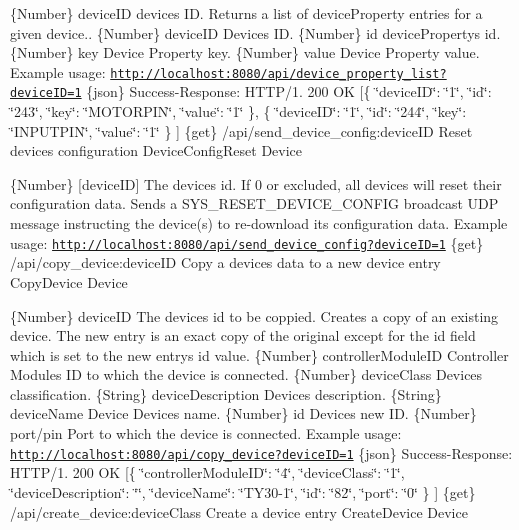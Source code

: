 \{Number\} device\+ID device\textquotesingle{}s ID.  Returns a list of device\+Property entries for a given device..  \{Number\} device\+ID Device\textquotesingle{}s ID.  \{Number\} id device\+Property\textquotesingle{}s id.  \{Number\} key Device Property key.  \{Number\} value Device Property value.  Example usage\+: \href{http://localhost:8080/api/device_property_list?deviceID=1}{\tt http\+://localhost\+:8080/api/device\+\_\+property\+\_\+list?device\+I\+D=1}  \{json\} Success-\/\+Response\+: H\+T\+T\+P/1. 200 OK \mbox{[}\{ \char`\"{}device\+I\+D\char`\"{}\+: \char`\"{}1\char`\"{}, \char`\"{}id\char`\"{}\+: \char`\"{}243\char`\"{}, \char`\"{}key\char`\"{}\+: \char`\"{}\+M\+O\+T\+O\+R\+P\+I\+N\char`\"{}, \char`\"{}value\char`\"{}\+: \char`\"{}1\char`\"{} \}, \{ \char`\"{}device\+I\+D\char`\"{}\+: \char`\"{}1\char`\"{}, \char`\"{}id\char`\"{}\+: \char`\"{}244\char`\"{}, \char`\"{}key\char`\"{}\+: \char`\"{}\+I\+N\+P\+U\+T\+P\+I\+N\char`\"{}, \char`\"{}value\char`\"{}\+: \char`\"{}1\char`\"{} \} \mbox{]}  \{get\} /api/send\+\_\+device\+\_\+config\+:device\+ID Reset device\textquotesingle{}s configuration  Device\+Config\+Reset  Device

\{Number\} \mbox{[}device\+ID\mbox{]} The device\textquotesingle{}s id. If 0 or excluded, all devices will reset their configuration data.  Sends a S\+Y\+S\+\_\+\+R\+E\+S\+E\+T\+\_\+\+D\+E\+V\+I\+C\+E\+\_\+\+C\+O\+N\+F\+IG broadcast U\+DP message instructing the device(s) to re-\/download its configuration data.  Example usage\+: \href{http://localhost:8080/api/send_device_config?deviceID=1}{\tt http\+://localhost\+:8080/api/send\+\_\+device\+\_\+config?device\+I\+D=1}  \{get\} /api/copy\+\_\+device\+:device\+ID Copy a device\textquotesingle{}s data to a new device entry  Copy\+Device  Device

\{Number\} device\+ID The device\textquotesingle{}s id to be coppied.  Creates a copy of an existing device. The new entry is an exact copy of the original except for the id field which is set to the new entry\textquotesingle{}s id value.  \{Number\} controller\+Module\+ID Controller Module\textquotesingle{}s ID to which the device is connected.  \{Number\} device\+Class Device\textquotesingle{}s classification.  \{String\} device\+Description Device\textquotesingle{}s description.  \{String\} device\+Name Device Device\textquotesingle{}s name.  \{Number\} id Device\textquotesingle{}s new ID.  \{Number\} port/pin Port to which the device is connected.  Example usage\+: \href{http://localhost:8080/api/copy_device?deviceID=1}{\tt http\+://localhost\+:8080/api/copy\+\_\+device?device\+I\+D=1}  \{json\} Success-\/\+Response\+: H\+T\+T\+P/1. 200 OK \mbox{[}\{ \char`\"{}controller\+Module\+I\+D\char`\"{}\+: \char`\"{}4\char`\"{}, \char`\"{}device\+Class\char`\"{}\+: \char`\"{}1\char`\"{}, \char`\"{}device\+Description\char`\"{}\+: \char`\"{}\char`\"{}, \char`\"{}device\+Name\char`\"{}\+: \char`\"{}\+T\+Y30-\/1\char`\"{}, \char`\"{}id\char`\"{}\+: \char`\"{}82\char`\"{}, \char`\"{}port\char`\"{}\+: \char`\"{}0\char`\"{} \} \mbox{]}  \{get\} /api/create\+\_\+device\+:device\+Class Create a device entry  Create\+Device  Device

